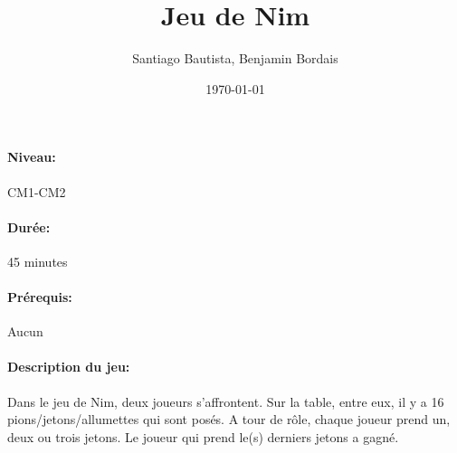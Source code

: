 \documentclass[12pt, a4paper]{article}
\begin{document}
\title{Jeu de Nim}
\author{Santiago Bautista, Benjamin Bordais}
\date{\today}
\maketitle
\paragraph*{Niveau:} CM1-CM2
\paragraph*{Durée:} 45 minutes
\paragraph*{Prérequis:} Aucun
\paragraph*{Description du jeu:}
Dans le jeu de Nim, deux joueurs s'affrontent. Sur la table, entre eux, il y a 16 pions/jetons/allumettes
qui sont posés. A tour de rôle, chaque joueur prend un, deux ou trois jetons.
Le joueur qui prend le(s) derniers jetons a gagné.
\end{document}
